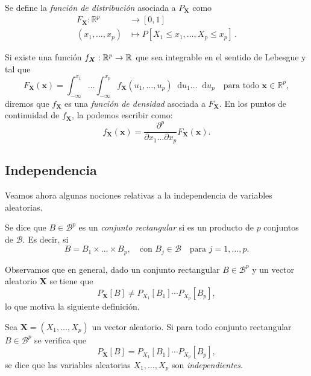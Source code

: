 \begin{ndef}
    Se define la \emph{función de distribución} asociada a $P_{\boldsymbol X}$ como
    \begin{align*}
    F_{\boldsymbol X}:\mathbb{R}^p &\rightarrow [0,1] \\
    (x_1,\dots,x_p) &\mapsto P[X_1 \leq x_1, \dots, X_p \leq x_p]\,.
    \end{align*}
\end{ndef}

\begin{ndef}
    Si existe una función $f_{\boldsymbol X} : \mathbb{R}^p \to \mathbb{R}$ que sea integrable en el sentido de Lebesgue y tal que
    \[
    F_{\boldsymbol X}(\boldsymbol x) = \int^{x_1}_{-\infty} \dots \int^{x_p}_{-\infty} f_{\boldsymbol X}(u_1, \dots,  u_p) \mathop{}\!\mathrm{d}u_1 \dots \mathop{}\!\mathrm{d}u_p\quad \text{para todo } \boldsymbol  x \in \mathbb{R}^p
    ,\]
    diremos que $f_{\boldsymbol X}$ es una \emph{función de densidad} asociada a  $F_{\boldsymbol X}$. En los puntos de continuidad de $f_{\boldsymbol X}$, la podemos escribir como:
    \[
    f_{\boldsymbol X}(\boldsymbol x) = \frac{\partial^p}{\partial x_1 \dots \partial x_p} F_{\boldsymbol X}(\boldsymbol x)
    .\]
\end{ndef}

\subsection{Independencia}

Veamos ahora algunas nociones relativas a la independencia de variables aleatorias.

\begin{ndef}
  Se dice que $B\in \mathscr{B}^p$ es un \emph{conjunto rectangular} si es un producto de $p$ conjuntos de $\mathscr{B}$. Es decir, si
\[
    B = B_1 \times \dots \times B_p,\quad\text{con }B_j \in \mathscr{B} \quad\text{para } j = 1, \dots, p
.\]
\end{ndef}

Observamos que en general, dado un conjunto rectangular $B \in \mathscr{B}^p$ y un vector aleatorio $\boldsymbol X$ se tiene que
\[
P_{\boldsymbol X}[B] \neq P_{X_1}[B_1] \cdots  P_{X_p}[B_p],
\]
lo que motiva la siguiente definición.

\begin{ndef}[Independencia]
    Sea $\boldsymbol X = (X_1, \dots, X_p)$ un vector aleatorio. Si para todo conjunto rectangular $B \in \mathscr{B}^p$ se verifica que \[
      P_{\boldsymbol X}[B] = P_{X_1}[B_1] \cdots  P_{X_p}[B_p],
      \] se dice que las variables aleatorias \(X_1, \dots, X_p\) son \emph{independientes}.
\end{ndef}


